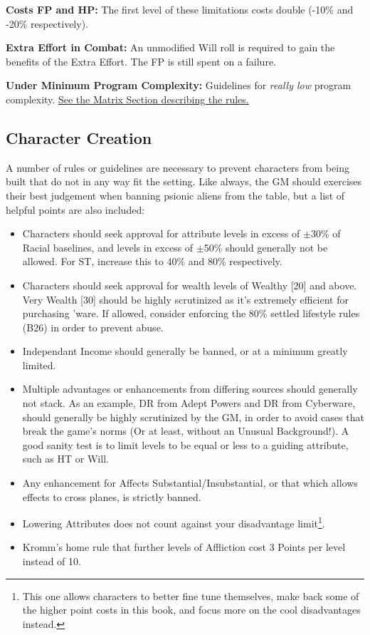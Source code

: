 \begin{multicols*}{3}
	\textbf{Costs FP and HP:} The first level of these limitations costs double (-10\% and -20\% respectively).
	
	\textbf{Extra Effort in Combat:} An unmodified Will roll is required to gain the benefits of the Extra Effort. The FP is still spent on a failure.
	
	\textbf{Under Minimum Program Complexity:} Guidelines for \textit{really low} program complexity. \hyperref[low_complexity]{See the Matrix Section describing the rules.}
	
	\subsection{Character Creation}
	
	A number of rules or guidelines are necessary to prevent characters from being built that do not in any way fit the setting. Like always, the GM should exercises their best judgement when banning psionic aliens from the table, but a list of helpful points are also included:
	
	\begin{itemize}
		\itemsep 0pt
		\item Characters should seek approval for attribute levels in excess of \(\pm\)30\% of Racial baselines, and levels in excess of \(\pm\)50\% should generally not be allowed. For ST, increase this to 40\% and 80\% respectively.
		\item Characters should seek approval for wealth levels of Wealthy [20] and above. Very Wealth [30] should be highly scrutinized as it's extremely efficient for purchasing 'ware. If allowed, consider enforcing the 80\% settled lifestyle rules (B26) in order to prevent abuse.
		\item Independant Income should generally be banned, or at a minimum greatly limited.
		\item Multiple advantages or enhancements from differing sources should generally not stack. As an example, DR from Adept Powers and DR from Cyberware, should generally be highly scrutinized by the GM, in order to avoid cases that break the game's norms (Or at least, without an Unusual Background!). A good sanity test is to limit levels to be equal or less to a guiding attribute, such as HT or Will.
		\item Any enhancement for Affects Substantial/Insubstantial, or that which allows effects to cross planes, is strictly banned.
		\item Lowering Attributes does not count against your disadvantage limit\footnote{This one allows characters to better fine tune themselves, make back some of the higher point costs in this book, and focus more on the cool disadvantages instead.}.
		\item Kromm's home rule that further levels of Affliction cost 3 Points per level instead of 10.
	\end{itemize}
	

\end{multicols*}
